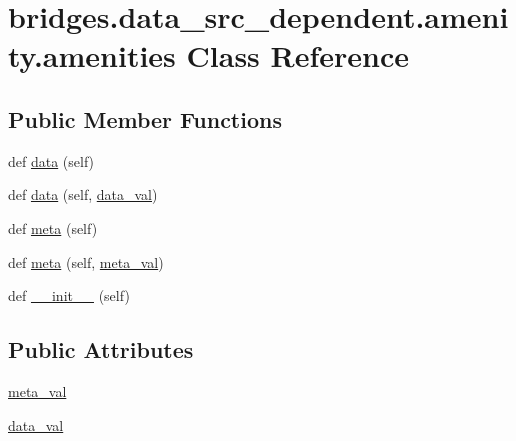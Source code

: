 \hypertarget{classbridges_1_1data__src__dependent_1_1amenity_1_1amenities}{}\section{bridges.\+data\+\_\+src\+\_\+dependent.\+amenity.\+amenities Class Reference}
\label{classbridges_1_1data__src__dependent_1_1amenity_1_1amenities}
\subsection*{Public Member Functions}
\begin{DoxyCompactItemize}
\item 
def \hyperlink{classbridges_1_1data__src__dependent_1_1amenity_1_1amenities_a812f61a499411c75d19f28917ddb0690}{data} (self)
\item 
def \hyperlink{classbridges_1_1data__src__dependent_1_1amenity_1_1amenities_a11bec2c15d9892f3b4beb344a861e9d7}{data} (self, \hyperlink{classbridges_1_1data__src__dependent_1_1amenity_1_1amenities_a17ca58db6595650c053849551a7f4f27}{data\+\_\+val})
\item 
def \hyperlink{classbridges_1_1data__src__dependent_1_1amenity_1_1amenities_a4fddb11077d3f8559fbd6290db7f3259}{meta} (self)
\item 
def \hyperlink{classbridges_1_1data__src__dependent_1_1amenity_1_1amenities_ad84b1cad4df0ee5ead8b973c0df068f8}{meta} (self, \hyperlink{classbridges_1_1data__src__dependent_1_1amenity_1_1amenities_a01a8bf4f1cc4798a438f9419ac5cabe6}{meta\+\_\+val})
\item 
def \hyperlink{classbridges_1_1data__src__dependent_1_1amenity_1_1amenities_a020a8d5b9aa33e5bff6730c3563cb46e}{\+\_\+\+\_\+init\+\_\+\+\_\+} (self)
\end{DoxyCompactItemize}
\subsection*{Public Attributes}
\begin{DoxyCompactItemize}
\item 
\hyperlink{classbridges_1_1data__src__dependent_1_1amenity_1_1amenities_a01a8bf4f1cc4798a438f9419ac5cabe6}{meta\+\_\+val}
\item 
\hyperlink{classbridges_1_1data__src__dependent_1_1amenity_1_1amenities_a17ca58db6595650c053849551a7f4f27}{data\+\_\+val}
\end{DoxyCompactItemize}



